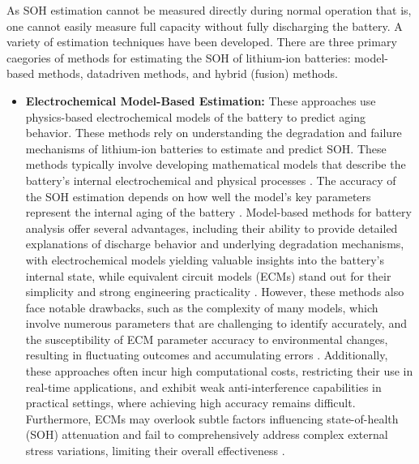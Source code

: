 As SOH estimation cannot be measured directly during normal operation that is, one cannot easily measure full capacity without fully discharging the battery. A variety of estimation techniques have been developed. There are three primary caegories of methods for estimating the SOH of lithium-ion batteries: model-based methods, datadriven methods, and hybrid (fusion) methods\cite{wevj-12-00113}. 
\begin{itemize}
    \item \textbf{Electrochemical Model-Based Estimation:} These approaches use physics-based electrochemical models of the battery to predict aging behavior. These methods rely on understanding the degradation  and failure mechanisms of lithium-ion batteries to estimate and predict SOH. These methods typically involve developing mathematical models that describe the battery's internal electrochemical and physical processes \cite{electronics-13-01675}\cite{s41598-025-92262-8}. The accuracy of the SOH estimation depends on how well the model's key parameters represent the internal aging of the battery \cite{wevj-12-00113}. Model-based methods for battery analysis offer several advantages, including their ability to provide detailed explanations of discharge behavior and underlying degradation mechanisms, with electrochemical models yielding valuable insights into the battery's internal state, while equivalent circuit models (ECMs) stand out for their simplicity and strong engineering practicality \cite{electronics-13-01675}\cite{wevj-12-00113}. However, these methods also face notable drawbacks, such as the complexity of many models, which involve numerous parameters that are challenging to identify accurately, and the susceptibility of ECM parameter accuracy to environmental changes, resulting in fluctuating outcomes and accumulating errors \cite{electronics-13-01675}\cite{wevj-12-00113}. Additionally, these approaches often incur high computational costs, restricting their use in real-time applications, and exhibit weak anti-interference capabilities in practical settings, where achieving high accuracy remains difficult. Furthermore, ECMs may overlook subtle factors influencing state-of-health (SOH) attenuation and fail to comprehensively address complex external stress variations, limiting their overall effectiveness \cite{electronics-13-01675}\cite{wevj-12-00113}.

\end{itemize}
